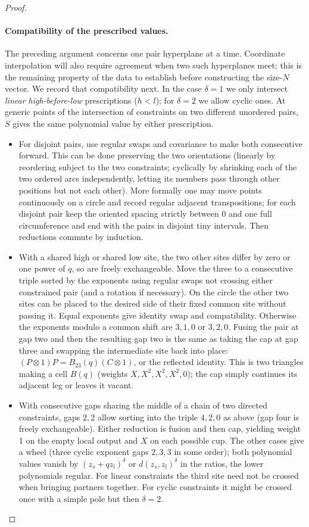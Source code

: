 \begin{proof}
\paragraph{Compatibility of the prescribed values.}
The preceding argument concerns one pair hyperplane at a time. Coordinate
interpolation will also require agreement when two such hyperplanes meet;
this is the remaining property of the data to establish before constructing
the size-$N$ vector. We record that compatibility next. In the case \(\delta=1\) we only intersect \emph{linear high-before-low} prescriptions (\(h<l\)); for \(\delta=2\) we allow cyclic ones. At generic points of the intersection of constraints on two different unordered pairs, \(S\) gives the same polynomial value by either prescription.
\begin{itemize}
\item For disjoint pairs, use regular swaps and covariance to make both consecutive forward. This can be done preserving the two orientations (linearly by reordering subject to the two constraints; cyclically by shrinking each of the two ordered arcs independently, letting its members pass through other positions but not each other). More formally one may move points continuously on a circle and record regular adjacent transpositions; for each disjoint pair keep the oriented spacing strictly between 0 and one full circumference and end with the pairs in disjoint tiny intervals. Then reductions commute by induction.
\item With a shared high or shared low site, the two other sites differ by zero or one power of \(q\), so are freely exchangeable. Move the three to a consecutive triple sorted by the exponents using regular swaps not crossing either constrained pair (and a rotation if necessary). On the circle the other two sites can be placed to the desired side of their fixed common site without passing it. Equal exponents give identity swap and compatibility. Otherwise the exponents modulo a common shift are \(3,1,0\) or \(3,2,0\). Fusing the pair at gap two and then the resulting gap two is the same as taking the cap at gap three and swapping the intermediate site back into place: \((P\otimes1)P=B_{23}(q)(C\otimes1)\), or the reflected identity. This is two triangles making a cell \(B(q)\) (weights \(X,X^2,X^2,X^2,0\)); the cap simply continues its adjacent leg or leaves it vacant.
\item With consecutive gaps sharing the middle of a chain of two directed constraints, gaps \(2,2\) allow sorting into the triple \(4,2,0\) as above (gap four is freely exchangeable). Either reduction is fusion and then cap, yielding weight 1 on the empty local output and \(X\) on each possible cup. The other cases give a wheel (three cyclic exponent gaps \(2,3,3\) in some order); both polynomial values vanish by \((z_s+qz_l)^\delta\) or \(d(z_s,z_l)^\delta\) in the ratios, the lower polynomials regular. For linear constraints the third site need not be crossed when bringing partners together. For cyclic constraints it might be crossed once with a simple pole but then \(\delta=2\).

\end{itemize}
\end{proof}
